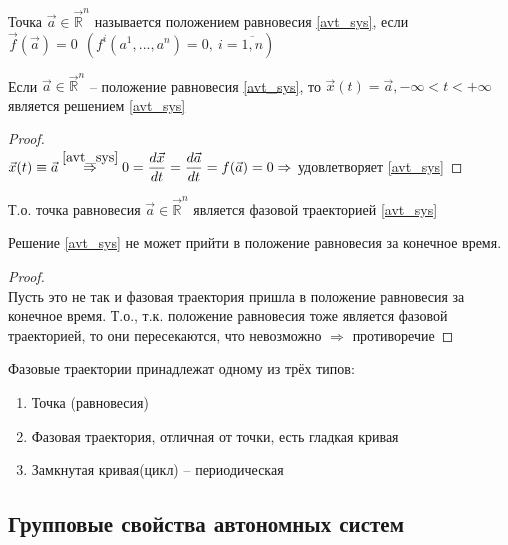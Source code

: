 \begin{definition}
	Точка $\vec{a} \in \vec{\mathbb{R}}^n$ называется положением равновесия \eqref{avt_sys}, если \\ $ \vec{f}(\vec{a}) = 0 \ \ (f^i(a^1, ..., a^n) = 0, \ i = \overline{1, n} )$
\end{definition}

\begin{proposition}
	Если $ \vec{a} \in \vec{\mathbb{R}}^n $ -- положение равновесия \eqref{avt_sys}, то $ \vec{x}(t) = \vec{a}, -\infty < t < + \infty$ является решением \eqref{avt_sys}
\end{proposition}

\begin{proof}
	\ \\
	$\vec{x}(t) \equiv \vec{a} \overset{\eqref{avt_sys}}{\Rightarrow} 0 = \dfrac{d\vec{x}}{dt} = \dfrac{d \vec{a}}{dt} = f(\vec{a}) = 0 \Rightarrow$ удовлетворяет \eqref{avt_sys}
\end{proof}
\noindent Т.о. точка равновесия $ \vec{a} \in \vec{\mathbb{R}}^n$ является фазовой траекторией \eqref{avt_sys}

\begin{corollary}
	Решение \eqref{avt_sys} не может прийти в положение равновесия за конечное время.
\end{corollary}

\begin{proof}
	\ \\
	Пусть это не так и фазовая траектория пришла в положение равновесия за конечное время. Т.о., т.к. положение равновесия тоже является фазовой траекторией, то они пересекаются, что невозможно $\Rightarrow$ противоречие 
\end{proof}

\begin{theorem}
	Фазовые траектории принадлежат одному из трёх типов:
	\begin{enumerate}
		\item Точка (равновесия)
		\item Фазовая траектория, отличная от точки, есть гладкая кривая
		\item Замкнутая кривая(цикл) -- периодическая
	\end{enumerate}
\end{theorem}

\subsection{Групповые свойства автономных систем}

